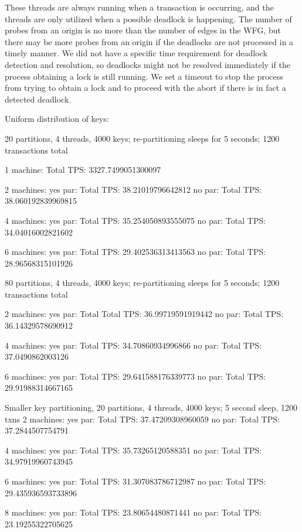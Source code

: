 \documentclass[a4paper, 10pt, notitlepage]{article}
\begin{document}
These threads are always running when a transaction is occurring, and the threads are only utilized when a possible deadlock is happening. The number of probes from an origin is no more than the number of edges in the WFG, but there may be more probes from an origin if the deadlocks are not processed in a timely manner. We did not have a specific time requirement for deadlock detection and resolution, so deadlocks might not be resolved immediately if the process obtaining a lock is still running. We set a timeout to stop the process from trying to obtain a lock and to proceed with the abort if there is in fact a detected deadlock.


\iffalse
Uniform distribution of keys:

20 partitions, 4 threads, 4000 keys; re-partitioning sleeps for 5 seconds; 1200 transactions total

1 machine:
Total TPS: 3327.7499051300097

2 machines:
yes par: Total TPS: 38.21019796642812
no par: Total TPS: 38.060192839969815

4 machines:
yes par: Total TPS: 35.254050893555075
no par: Total TPS: 34.04016002821602

6 machines:
yes par: Total TPS: 29.402536313413563
no par: Total TPS: 28.96568315101926


80 partitions, 4 threads, 4000 keys; re-partitioning sleeps for 5 seconds; 1200 transactions total

2 machines:
yes par: Total Total TPS: 36.99719591919442
no par: Total TPS: 36.14329578690912

4 machines:
yes par: Total TPS: 34.70860934996866
no par: Total TPS: 37.0490862003126

6 machines:
yes par: Total TPS: 29.641588176339773
no par: Total TPS: 29.91988314667165

Smaller key partitioning, 20 partitions, 4 threads, 4000 keys; 5 second sleep, 1200 txns
2 machines:
yes par: Total TPS: 37.47209308960059
no par: Total TPS: 37.2844507754791

4 machines:
yes par: Total TPS: 35.73265120588351
no par: Total TPS: 34.97919960743945

6 machines:
yes par: Total TPS: 31.307083786712987
no par: Total TPS: 29.435936593733896

8 machines:
yes par: Total TPS: 23.80654480871441
no par: Total TPS: 23.19255322705625
\end{document}
